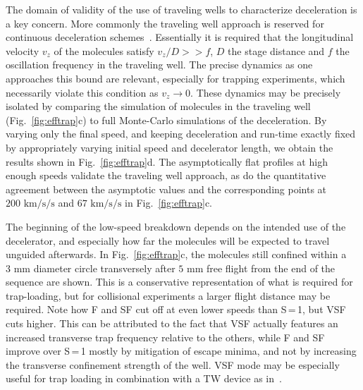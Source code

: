 \documentclass[%
 reprint,
 amsmath,amssymb,
 aps,
prl,
]{revtex4-1}
\begin{document}
The domain of validity of the use of traveling wells to characterize deceleration is a key concern.
More commonly the traveling well approach is reserved for continuous deceleration schemes~\cite{Osterwalder2010,Narevicius2008}.
Essentially it is required that the longitudinal velocity $v_z$ of the molecules satisfy $v_z/D >> f$, $D$ the stage distance and $f$ the oscillation frequency in the traveling well.
The precise dynamics as one approaches this bound are relevant, especially for trapping experiments, which necessarily violate this condition as $v_z\rightarrow 0$.
These dynamics may be precisely isolated by comparing the simulation of molecules in the traveling well (Fig.~\ref{fig:efftrap}c) to full Monte-Carlo simulations of the deceleration.
By varying only the final speed, and keeping deceleration and run-time exactly fixed by appropriately varying initial speed and decelerator length, we obtain the results shown in Fig.~\ref{fig:efftrap}d.
The asymptotically flat profiles at high enough speeds validate the traveling well approach, as do the quantitative agreement between the asymptotic values and the corresponding points at $200\text{ km/s/s}$ and $67\text{ km/s/s}$ in Fig.~\ref{fig:efftrap}c.

The beginning of the low-speed breakdown depends on the intended use of the decelerator, and especially how far the molecules will be expected to travel unguided afterwards.
In Fig.~\ref{fig:efftrap}c, the molecules still confined within a $3\text{ mm}$ diameter circle transversely after $5\text{ mm}$ free flight from the end of the sequence are shown. 
This is a conservative representation of what is required for trap-loading, but for collisional experiments a larger flight distance may be required.
Note how F and SF cut off at even lower speeds than S\,=\,1, but VSF cuts higher. 
This can be attributed to the fact that VSF actually features an increased transverse trap frequency relative to the others, while F and SF improve over S\,=\,1 mostly by mitigation of escape minima, and not by increasing the transverse confinement strength of the well.
VSF mode may be especially useful for trap loading in combination with a TW device as in~\cite{Quintero-Perez2013}.
\end{document}

